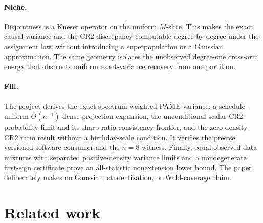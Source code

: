\documentclass{article}
\begin{document}
\paragraph{Niche.} Disjointness is a Kneser operator on the uniform \(M\)-slice. This makes the exact causal variance and the CR2 discrepancy computable degree by degree under the assignment law, without introducing a superpopulation or a Gaussian approximation. The same geometry isolates the unobserved degree-one cross-arm energy that obstructs uniform exact-variance recovery from one partition.

\paragraph{Fill.} The project derives the exact spectrum-weighted PAME variance, a schedule-uniform \(O(n^{-1})\) dense projection expansion, the unconditional scalar CR2 probability limit and its sharp ratio-consistency frontier, and the zero-density CR2 ratio result without a birthday-scale condition. It verifies the precise versioned software consumer and the \(n=8\) witness. Finally, equal observed-data mixtures with separated positive-density variance limits and a nondegenerate first-sign certificate prove an all-statistic nonextension lower bound. The paper deliberately makes no Gaussian, studentization, or Wald-coverage claim.

\section{Related work}
\end{document}
